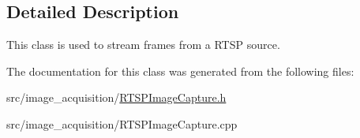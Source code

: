 \subsection{Detailed Description}
This class is used to stream frames from a R\+T\+SP source. 

The documentation for this class was generated from the following files\+:\begin{DoxyCompactItemize}
\item 
src/image\+\_\+acquisition/\mbox{\hyperlink{_r_t_s_p_image_capture_8h}{R\+T\+S\+P\+Image\+Capture.\+h}}\item 
src/image\+\_\+acquisition/R\+T\+S\+P\+Image\+Capture.\+cpp\end{DoxyCompactItemize}
